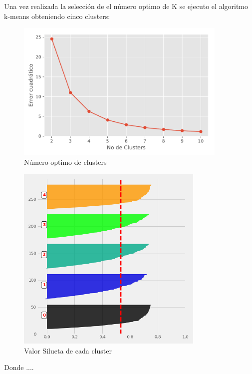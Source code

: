 Una vez realizada la selección de el número optimo de K se ejecuto el algoritmo k-means obteniendo cinco clusters:

\begin{figure}[H] 
	\centering
	\includegraphics[width=0.9\textwidth]{Kap4/Clusters}
	\caption{Número optimo de clusters} 
	\label{fig:Clusters}
\end{figure}

\begin{figure}[H] 
	\centering
	\includegraphics[width=0.8\textwidth]{Kap4/S}
	\caption{Valor Silueta de cada cluster} 
	\label{fig:S}
\end{figure}

Donde ....

